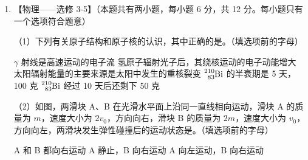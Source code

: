 \documentclass[\gkver]{gaokaozhenti}
\begin{document}
\begin{enumerate}

\item
【物理——选修 3-5】（本题共有两小题，每小题 6 分，共 12 分。每小题只有一个选项符合题意）

（1）下列有关原子结构和原子核的认识，其中正确的是。（填选项前的字母）

\fourchoices
{$\gamma$ 射线是高速运动的电子流}
{氢原子辐射光子后，其绕核运动的电子动能增大}
{太阳辐射能量的主要来源是太阳中发生的重核裂变}
{$\ce{^{210}_{83}Bi}$ 的半衰期是 5 天，100 克 $\ce{^{210}_{83}Bi}$ 经过 10 天后还剩下 50 克}

（2）如图，两滑块 A、B 在光滑水平面上沿同一直线相向运动，滑块 A 的质量为 $m$，速度大小为 $2v_{0}$，方向向右，滑块 B 的质量为 $2m$，速度大小为 $v_{0}$，方向向左，两滑块发生弹性碰撞后的运动状态是。（填选项前的字母）


{A 和 B 都向右运动}
{A 静止，B 向右运动}
{A 向左运动，B 向右运动}


\end{enumerate}
\end{document}
